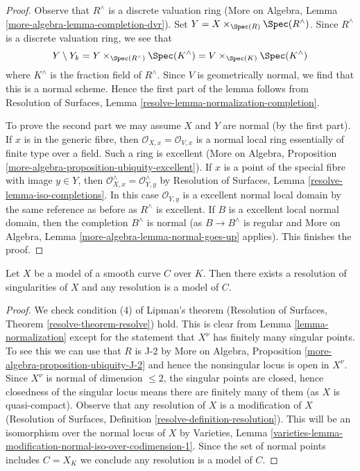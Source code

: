 \begin{proof}
Observe that $R^\wedge$ is a discrete valuation ring
(More on Algebra, Lemma \ref{more-algebra-lemma-completion-dvr}).
Set $Y = X \times_{\Spec(R)} \Spec(R^\wedge)$.
Since $R^\wedge$ is a discrete valuation ring, we see that
$$
Y \setminus Y_k =
Y \times_{\Spec(R^\wedge)} \Spec(K^\wedge) =
V \times_{\Spec(K)} \Spec(K^\wedge)
$$
where $K^\wedge$ is the fraction field of $R^\wedge$.
Since $V$ is geometrically normal, we find that this is
a normal scheme. Hence the first part of the lemma follows from
Resolution of Surfaces, Lemma \ref{resolve-lemma-normalization-completion}.

\medskip\noindent
To prove the second part we may assume $X$ and $Y$ are normal
(by the first part). If $x$ is in the generic fibre, then
$\mathcal{O}_{X, x} = \mathcal{O}_{V, x}$ is a normal local
ring essentially of finite type over a field. Such a ring is
excellent (More on Algebra, Proposition
\ref{more-algebra-proposition-ubiquity-excellent}).
If $x$ is a point of the special fibre with image $y \in Y$, then
$\mathcal{O}_{X, x}^\wedge = \mathcal{O}_{Y, y}^\wedge$
by Resolution of Surfaces, Lemma \ref{resolve-lemma-iso-completions}.
In this case $\mathcal{O}_{Y, y}$ is a excellent normal local domain
by the same reference as before as $R^\wedge$ is excellent.
If $B$ is a excellent local normal domain, then the completion
$B^\wedge$ is normal (as $B \to B^\wedge$ is regular and
More on Algebra, Lemma \ref{more-algebra-lemma-normal-goes-up} applies).
This finishes the proof.
\end{proof}

\begin{lemma}
\label{lemma-regular}
Let $X$ be a model of a smooth curve $C$ over $K$. Then
there exists a resolution of singularities of $X$
and any resolution is a model of $C$.
\end{lemma}

\begin{proof}
We check condition (4) of Lipman's theorem
(Resolution of Surfaces, Theorem \ref{resolve-theorem-resolve}) hold.
This is clear from Lemma \ref{lemma-normalization}
except for the statement that $X^\nu$ has finitely many
singular points. To see this we can use that $R$ is J-2 by
More on Algebra, Proposition \ref{more-algebra-proposition-ubiquity-J-2}
and hence the nonsingular locus is open in $X^\nu$.
Since $X^\nu$ is normal of dimension $\leq 2$, the singular points
are closed, hence closedness of the singular locus
means there are finitely many of them (as $X$ is quasi-compact).
Observe that any resolution of $X$ is a modification of $X$
(Resolution of Surfaces, Definition \ref{resolve-definition-resolution}).
This will be an isomorphism over the normal locus of $X$ by Varieties, Lemma
\ref{varieties-lemma-modification-normal-iso-over-codimension-1}.
Since the set of normal points includes
$C = X_K$ we conclude any resolution is a model of $C$.
\end{proof}


